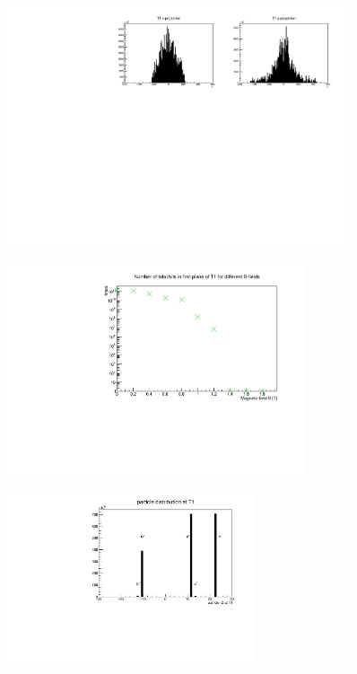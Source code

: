\begin{frame}[t]{}
  \vspace*{\fill}
    \begin{figure}
      \centering
      \includegraphics[width=0.9\textwidth]{../hists/strawtubes/all/proj_0.pdf}
    \end{figure}
  \vspace*{\fill}
\end{frame}

\begin{frame}[t]{}
  \begin{figure}
    \centering
    \includegraphics[width=0.78\textwidth]{../hists/strawtubes/all/hits_bfield.pdf}
  \end{figure}
\end{frame}

\begin{frame}[t]{}
  \begin{figure}
    \centering
    \includegraphics[width=0.65\textwidth]{../hists/strawtubes/all/pdg_T1.pdf}
  \end{figure}
\end{frame}

